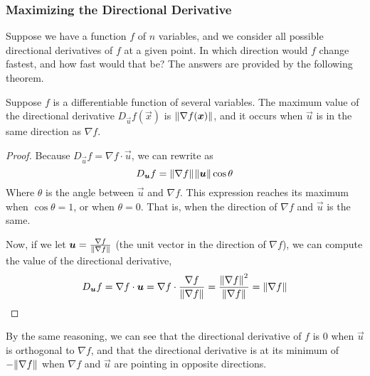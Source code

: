\subsubsection{Maximizing the Directional Derivative}
Suppose we have a function \(f\) of \(n\) variables, and we consider all possible directional derivatives of \(f\) at a given point. In which direction would \(f\) change fastest, and how fast would that be? The answers are provided by the following theorem.
\begin{theorem}
    Suppose \(f\) is a differentiable function of several variables. The maximum value of the directional derivative \(D_{\vec u}f(\vec x)\) is \(\norm{\nabla f(\boldsymbol{x})}\), and it occurs when \(\vec u\) is in the same direction as \(\nabla f\).
\end{theorem}
\begin{proof}
    Because \(D_{\vec u}f = \nabla f \cdot \vec u\), we can rewrite as 
    \[ D_{\boldsymbol{u}}f = \norm{\nabla f}\hspace{0.25mm}\norm{\boldsymbol{u}}\cos \theta \]
    Where \(\theta\) is the angle between \(\vec u\) and \(\nabla f\). This expression reaches its maximum when \(\cos\theta=1\), or when \(\theta = 0\). That is, when the direction of \(\nabla f\) and \(\vec u\) is the same.\par
    Now, if we let \(\boldsymbol{u} = \frac{\nabla f}{\norm{\nabla f}}\) (the unit vector in the direction of \(\nabla f\)), we can compute the value of the directional derivative,
    \[ D_{\boldsymbol{u}}f = \nabla f \cdot \boldsymbol{u} = \nabla f \cdot \frac{\nabla f}{\norm{\nabla f}} = \frac{\norm{\nabla f}^2}{\norm{\nabla f}} = \norm{\nabla f}\]
\end{proof}
By the same reasoning, we can see that the directional derivative of \(f\) is \(0\) when \(\vec u\) is orthogonal to \(\nabla f\), and that the directional derivative is at its minimum of \(-\norm{\nabla f}\) when \(\nabla f\) and \(\vec u\) are pointing in opposite directions.
